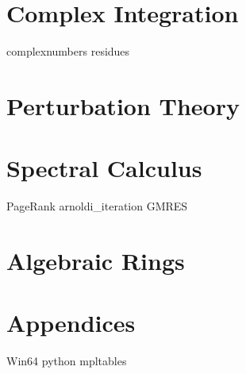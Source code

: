 \documentclass[nociteref]{SIAM-GH-book}
\begin{document}
\part{Complex Integration}
{complexnumbers}
{residues}

\part{Perturbation Theory}

\part{Spectral Calculus}
{PageRank}
{arnoldi_iteration}
{GMRES}



\part{Algebraic Rings}

\part{Appendices}
{Win64}
{python}
{mpltables}
\end{document}
